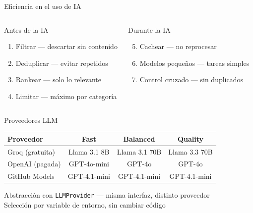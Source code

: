 \documentclass[10pt,xcolor={dvipsnames}]{beamer}
\begin{document}
\begin{frame}{Eficiencia en el uso de IA}

\begin{columns}[T]
\begin{block}{Antes de la IA}
\begin{enumerate}
    \item \alert{Filtrar} --- descartar sin contenido
    \item \alert{Deduplicar} --- evitar repetidos
    \item \alert{Rankear} --- solo lo relevante
    \item \alert{Limitar} --- máximo por categoría
\end{enumerate}
\end{block}

\begin{block}{Durante la IA}
\begin{enumerate}\setcounter{enumi}{4}
    \item \alert{Cachear} --- no reprocesar
    \item \alert{Modelos pequeños} --- tareas simples
    \item \alert{Control cruzado} --- sin duplicados
\end{enumerate}
\end{block}
\end{columns}

\vspace{0.3cm}
\centering
{}
\end{frame}

\begin{frame}{Proveedores LLM}

\begin{table}[H]
\centering
\small
\begin{tabular}{lccc}
\toprule
\textbf{Proveedor} & \textbf{Fast} & \textbf{Balanced} & \textbf{Quality} \\
\midrule
Groq (gratuita) & Llama 3.1 8B & Llama 3.1 70B & Llama 3.3 70B \\
\midrule
OpenAI (pagada) & GPT-4o-mini & GPT-4o & GPT-4o \\
\midrule
GitHub Models & GPT-4.1-mini & GPT-4.1-mini & GPT-4.1-mini \\
\bottomrule
\end{tabular}
\end{table}

\vspace{0.3cm}
\centering
\small Abstracción con \texttt{LLMProvider} --- misma interfaz, distinto proveedor\\[4pt]
Selección por variable de entorno, sin cambiar código
\end{frame}
\end{document}
